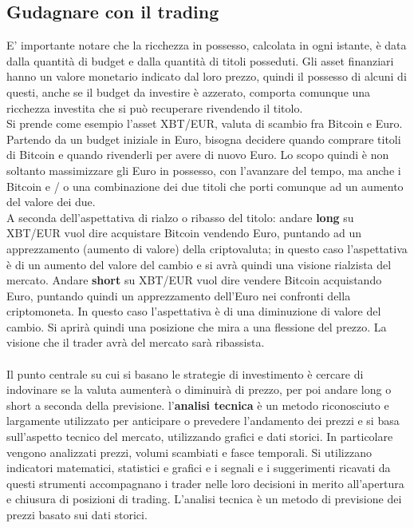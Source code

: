 \documentclass{article}
\numberwithin{equation}{section}
\begin{document}
	\subsection{Gudagnare con il trading}
		E' importante notare che la ricchezza in possesso, calcolata in ogni istante, è data dalla quantità di budget e dalla quantità di titoli posseduti. Gli asset finanziari hanno un valore monetario indicato dal loro prezzo, quindi il possesso di alcuni di questi, anche se il budget da investire è azzerato, comporta comunque una ricchezza investita che si può recuperare rivendendo il titolo.\\
		Si prende come esempio l'asset XBT/EUR, valuta di scambio fra Bitcoin e Euro. Partendo da un budget iniziale in Euro, bisogna decidere quando comprare titoli di Bitcoin e quando rivenderli per avere di nuovo Euro. Lo scopo quindi è non soltanto massimizzare gli Euro in possesso, con l'avanzare del tempo, ma anche i Bitcoin e / o una combinazione dei due titoli che porti comunque ad un aumento del valore dei due.\\
		A seconda dell'aspettativa di rialzo o ribasso del titolo: andare \textbf{long} su XBT/EUR vuol dire acquistare Bitcoin vendendo Euro, puntando ad un apprezzamento (aumento di valore) della criptovaluta; in questo caso l’aspettativa è di un aumento del valore del cambio e si avrà quindi una visione rialzista del mercato. Andare \textbf{short} su XBT/EUR vuol dire vendere Bitcoin acquistando Euro, puntando quindi un apprezzamento dell'Euro nei confronti della criptomoneta. In questo caso l’aspettativa è di una diminuzione di valore del cambio. Si aprirà quindi una posizione che mira a una flessione del prezzo. La visione che il trader avrà del mercato sarà ribassista.\\~\\
		Il punto centrale su cui si basano le strategie di investimento è cercare di indovinare se la valuta aumenterà o diminuirà di prezzo, per poi andare long o short a seconda della previsione. l'\textbf{analisi tecnica} è un metodo riconosciuto e largamente utilizzato per anticipare o prevedere l'andamento dei prezzi e si basa sull'aspetto tecnico del mercato, utilizzando grafici e dati storici. In particolare vengono analizzati prezzi, volumi scambiati e fasce temporali. Si utilizzano indicatori matematici, statistici e grafici e i segnali e i suggerimenti ricavati da questi strumenti accompagnano i trader nelle loro decisioni in merito all'apertura e chiusura di posizioni di trading. L'analisi tecnica è un metodo di previsione dei prezzi basato sui dati storici.
\end{document}
